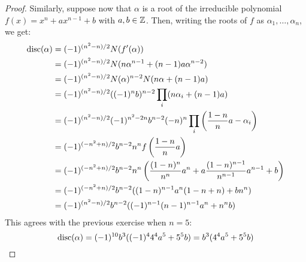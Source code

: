 \begin{proof}
    Similarly, suppose now that $\alpha$ is a root of the irreducible polynomial $f(x) = x^n+ax^{n-1}+b$ with $a,b \in \mathbb{Z}$. Then, writing the roots of $f$ as $\alpha_1,\ldots,\alpha_n$, we get:
    \begin{align*}
    \operatorname{disc}(\alpha)
        &= (-1)^{(n^2-n)/2}N(f'(\alpha)) \\
        &= (-1)^{(n^2-n)/2}N(n\alpha^{n-1}+(n-1)a\alpha^{n-2}) \\
        &= (-1)^{(n^2-n)/2}N(\alpha)^{n-2}N(n\alpha+(n-1)a) \\
        &= (-1)^{(n^2-n)/2}((-1)^nb)^{n-2}\prod_i (n\alpha_i+(n-1)a) \\
        &= (-1)^{(n^2-n)/2}(-1)^{n^2-2n}b^{n-2}(-n)^n\prod_i \left(\frac{1-n}{n}a-\alpha_i\right) \\
        &= (-1)^{(-n^2+n)/2}b^{n-2}n^nf\left(\frac{1-n}{n}a\right) \\
        &= (-1)^{(-n^2+n)/2}b^{n-2}n^n\left(\frac{(1-n)^n}{n^n}a^n + a\frac{(1-n)^{n-1}}{n^{n-1}}a^{n-1} + b\right) \\
        &= (-1)^{(-n^2+n)/2}b^{n-2}((1-n)^{n-1}a^n(1-n+n) + bn^n) \\
        &= (-1)^{(n^2-n)/2}b^{n-2}((-1)^{n-1}(n-1)^{n-1}a^n + n^nb)
    \end{align*}
    This agrees with the previous exercise when $n=5$:
    \[ \operatorname{disc}(\alpha) = (-1)^{10}b^3((-1)^44^4a^5+5^5b) = b^3(4^4a^5+5^5b) \]
\end{proof}
